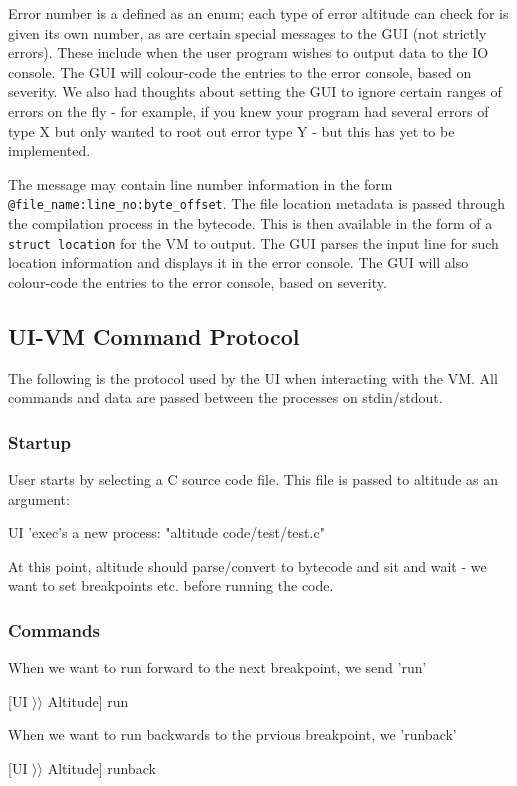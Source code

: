 \documentclass[10pt,a4paper]{report}
\begin{document}
Error number is a defined as an enum; each type of error altitude can check for is given its own number, as are certain special messages to the GUI (not strictly errors). These include when the user program wishes to output data to the IO console. The GUI will colour-code the entries to the error console, based on severity. We also had thoughts about setting the GUI to ignore certain ranges of errors on the fly -  for example, if you knew your program had several errors of type X but only wanted to root out error type Y - but this has yet to be implemented.

The message may contain line number information in the form \lstinline{@file_name:line_no:byte_offset}. The file location metadata is passed through the compilation process in the bytecode. This is then available in the form of a \lstinline{struct location} for the VM to output. The GUI parses the input line for such location information and displays it in the error console. The GUI will also colour-code the entries to the error console, based on severity.

\subsection{UI-VM Command Protocol}
The following is the protocol used by the UI when interacting with the VM. All commands and data are passed between the processes on stdin/stdout.
\subsubsection{Startup}
User starts by selecting a C source code file. This file is passed to altitude as an argument:

UI 'exec's a new process: "altitude code/test/test.c"

At this point, altitude should parse/convert to bytecode and sit and wait - we want to set breakpoints etc. before running the code.

\subsubsection{Commands}

When we want to run forward to the next breakpoint, we send 'run'

[UI $\rangle\rangle$ Altitude] run

When we want to run backwards to the prvious breakpoint, we 'runback'

[UI $\rangle\rangle$ Altitude] runback
\end{document}
